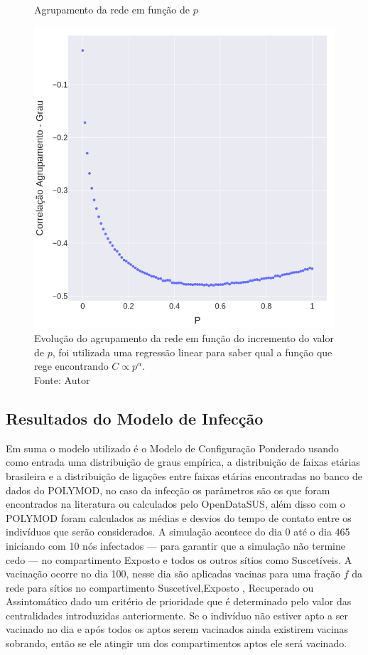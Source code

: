 \begin{figure}[H]
    \centering
    \captionsetup{font=normalsize,skip=0.8pt,singlelinecheck=on,labelsep=endash}
    \caption{Agrupamento da rede em função de $p$}
    \includegraphics[scale= 0.45]{figuras/correlation.png}
    \captionsetup{font=small,justification=justified}    \caption*{Evolução do agrupamento da rede em função 
    do incremento do valor de $p$, foi utilizada uma regressão linear para saber qual a função que rege encontrando $C \propto p^{\alpha}$.\\Fonte: Autor}
    \label{fig:correlation}
\end{figure}

\subsection{Resultados do Modelo de Infecção}

Em suma o modelo utilizado é o Modelo de Configuração Ponderado usando como entrada uma distribuição de graus empírica, a distribuição de faixas etárias brasileira e a distribuição de ligações entre faixas etárias encontradas no banco de dados do POLYMOD, no caso da infecção os parâmetros são os que foram encontrados na literatura ou calculados pelo OpenDataSUS, além disso com o POLYMOD foram calculados as médias e desvios do tempo de contato entre os indivíduos que serão considerados. A simulação acontece do dia 0 até o dia 465 iniciando com 10 nós infectados — para garantir que a simulação não termine cedo — no compartimento Exposto e todos os outros sítios como Suscetíveis. A vacinação ocorre no dia 100, nesse dia são aplicadas vacinas para uma fração $f$ da rede para sítios no compartimento Suscetível,Exposto , Recuperado ou Assintomático dado um critério de prioridade que é determinado pelo valor das centralidades introduzidas anteriormente. Se o indivíduo não estiver apto a ser vacinado no dia e após todos os aptos serem vacinados ainda existirem vacinas sobrando, então se ele atingir um dos compartimentos aptos ele será vacinado.

